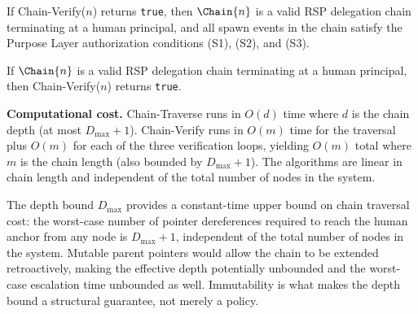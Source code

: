 \begin{prop}
\label{prop:chain-verify-soundness}
If Chain-Verify($n$) returns \texttt{true}, then $\Chain{n}$ is a valid RSP delegation chain terminating at a human principal, and all spawn events in the chain satisfy the Purpose Layer authorization conditions (S1), (S2), and (S3).
\end{prop}

\begin{prop}
\label{prop:chain-verify-completeness}
If $\Chain{n}$ is a valid RSP delegation chain terminating at a human principal, then Chain-Verify($n$) returns \texttt{true}.
\end{prop}

\medskip
\noindent\textbf{Computational cost.} Chain-Traverse runs in $O(d)$ time where $d$ is the chain depth (at most $D_{\max} + 1$). Chain-Verify runs in $O(m)$ time for the traversal plus $O(m)$ for each of the three verification loops, yielding $O(m)$ total where $m$ is the chain length (also bounded by $D_{\max} + 1$). The algorithms are linear in chain length and independent of the total number of nodes in the system.

The depth bound $D_{\max}$ provides a constant-time upper bound on chain traversal cost: the worst-case number of pointer dereferences required to reach the human anchor from any node is $D_{\max} + 1$, independent of the total number of nodes in the system. Mutable parent pointers would allow the chain to be extended retroactively, making the effective depth potentially unbounded and the worst-case escalation time unbounded as well. Immutability is what makes the depth bound a structural guarantee, not merely a policy.
